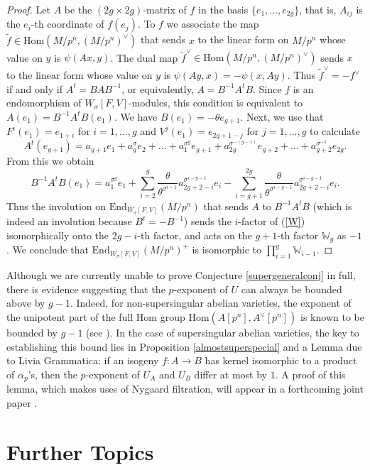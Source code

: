 \documentclass[a4paper,12pt,twoside]{report}
\newcommand{\Hom}{\mathrm{Hom}}
\newcommand{\W}{\mathbb{W}}
\begin{document}
\begin{proof}
Let $A$ be the $(2g\times 2g)$-matrix of $f$ in the basis $\{e_1,\ldots, e_{2g}\}$,
that is, $A_{ij}$ is the $e_i$-th coordinate of $f(e_j)$.
To $f$ we associate the map $\tilde f\in\Hom(M/p^n,(M/p^n)^\vee)$ that sends
$x$ to the linear form on $M/p^n$ whose value on $y$ is $\psi(Ax,y)$.
The dual map $\tilde f^\vee\in\Hom(M/p^n,(M/p^n)^\vee)$ sends $x$ to the linear form
whose value on $y$ is $\psi(Ay,x)=-\psi(x,Ay)$. Thus $\tilde f^\vee=-f^\vee$ if and only if
$A^t=BAB^{-1}$, or equivalently, $A=B^{-1}A^tB$. Since $f$ is an endomorphism of $W_{\sigma}[F,V]$-modules, this condition is equivalent to 
$A(e_1)=B^{-1}A^tB(e_1)$. We have $B(e_1)=-\theta e_{g+1}$. Next, 
we use that $F^i(e_1)=e_{1+i}$ for $i=1,\ldots,g$ and $V^j(e_1)=e_{2g+1-j}$ 
for $j=1,\ldots, g$ to calculate
$$A^t(e_{g+1})=a_{g+1}e_1+a_g^\sigma e_2+\ldots+a_1^{\sigma^g}e_{g+1}+
a_{2g}^{\sigma^{-(g-1)}} e_{g+2}+\ldots+a_{g+2}^{\sigma^{-1}}e_{2g}.$$
From this we obtain 
$$B^{-1}A^tB(e_1)=a_1^{\sigma^g}e_1+
\sum_{i=2}^g \frac{\theta}{\theta^{\sigma^{i-1}}}a_{2g+2-i}^{\sigma^{i-g-1}}e_i
-\sum_{i=g+1}^{2g}\frac{\theta}{\theta^{\sigma^{i-g-1}}}a_{2g+2-i}^{\sigma^{i-g-1}}e_i.$$
Thus the involution on $\mathrm{End}_{W_\sigma[F,V]}(M/p^n)$ that sends $A$ to $B^{-1}A^tB$ (which is indeed
an involution because $B^t=-B^{-1}$)
sends the $i$-factor of (\ref{W}) isomorphically onto the $2g-i$-th factor, and acts on
the $g+1$-th factor $\W_g$ as $-1$. We conclude that $\mathrm{End}_{W_{\sigma}[F,V]}(M/p^n)^+$ is isomorphic to 
$\prod_{i=1}^g {\mathbb W}_{i-1}$.    
\end{proof}

Although we are currently unable to prove Conjecture \ref{supergeneralconj} in full, 
there is evidence suggesting that the $p$-exponent of $U$ can always be bounded above by $g-1$. 
Indeed, for non-supersingular abelian varieties, the exponent of the unipotent part of the full Hom group 
$\Hom(A[p^n],A^\vee[p^n])$ is known to be bounded by $g-1$ (see \cite{LNV}). 
In the case of supersingular abelian varieties, the key to establishing this bound 
lies in Proposition \ref{almostsuperspecial} and a Lemma due to Livia Grammatica: if an isogeny $f:A\rightarrow B$ has kernel isomorphic to a product of $\alpha_p$'s, 
then the $p$-exponent of $U_A$ and $U_B$ differ at most by $1$. 
A proof of this lemma, which makes uses of Nygaard filtration, will appear in a forthcoming joint 
paper \cite{Skor}.   

\part{Further Topics}
\end{document}
